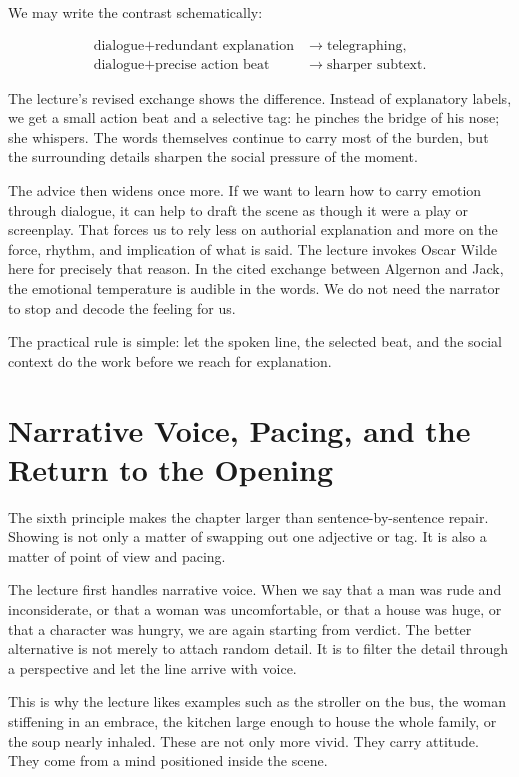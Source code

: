 We may write the contrast schematically:

\begin{align}
\text{dialogue} + \text{redundant explanation} &\to \text{telegraphing},\\
\text{dialogue} + \text{precise action beat} &\to \text{sharper subtext}.
\end{align}

The lecture's revised exchange shows the difference. Instead of explanatory labels, we get a small action beat and a selective tag: he pinches the bridge of his nose; she whispers. The words themselves continue to carry most of the burden, but the surrounding details sharpen the social pressure of the moment.

The advice then widens once more. If we want to learn how to carry emotion through dialogue, it can help to draft the scene as though it were a play or screenplay. That forces us to rely less on authorial explanation and more on the force, rhythm, and implication of what is said. The lecture invokes Oscar Wilde here for precisely that reason. In the cited exchange between Algernon and Jack, the emotional temperature is audible in the words. We do not need the narrator to stop and decode the feeling for us.

The practical rule is simple: let the spoken line, the selected beat, and the social context do the work before we reach for explanation.

\section{Narrative Voice, Pacing, and the Return to the Opening}

The sixth principle makes the chapter larger than sentence-by-sentence repair. Showing is not only a matter of swapping out one adjective or tag. It is also a matter of point of view and pacing.

The lecture first handles narrative voice. When we say that a man was rude and inconsiderate, or that a woman was uncomfortable, or that a house was huge, or that a character was hungry, we are again starting from verdict. The better alternative is not merely to attach random detail. It is to filter the detail through a perspective and let the line arrive with voice.

This is why the lecture likes examples such as the stroller on the bus, the woman stiffening in an embrace, the kitchen large enough to house the whole family, or the soup nearly inhaled. These are not only more vivid. They carry attitude. They come from a mind positioned inside the scene.

